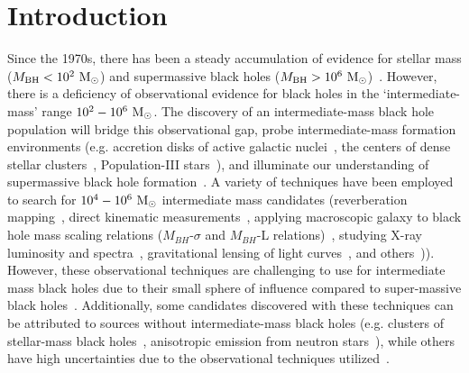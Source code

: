 \documentclass[%
 nofootinbib,
 amsmath,amssymb,
 aps,
 twocolumn,
 superscriptaddress
]{revtex4-2}
\newcommand{\mathcmd}[1]{{\sc \relax\ifmmode#1\else $#1$\fi}\xspace}
\newcommand{\msun}{\mathcmd{\text{M}_\odot}}
\begin{document}
\section{Introduction}
Since the 1970s, there has been a steady accumulation of evidence for stellar mass ($M_\text{BH} < 10^{2} \ \msun$) and supermassive black holes ($M_\text{BH} > 10^{6} \ \msun$)~\cite{Webster:1972:Natur, Balick:1974:ApJ, Ghez:1998:ApJ, Genzel:2010:RvMP, Abbott:2019:PhRvX, EventHorizonTelescopeCollaboration:2019:ApJL, Abbott:2020:arXiv}.  However, there is a deficiency of observational evidence for black holes in the `intermediate-mass' range $10^{2} - 10^{6}\ \msun$. The discovery of an intermediate-mass black hole population will bridge this observational gap, probe intermediate-mass formation environments (e.g. accretion disks of active galactic nuclei~\cite{Tagawa:2021:ApJ, Li:2021:arXiv, Samsing:2020:arXiv, Tagawa:2020:ApJ, Ishibashi:2020:A&A, Grobner:2020:A&A, Yang:2019:PhRvL, McKernan:2019:ApJL, Yang:2019:ApJ, McKernan:2018:ApJ, Bellovary:2016:ApJL, McKernan:2014:MNRAS, McKernan:2012:MNRAS}, the centers of dense stellar clusters~\cite{Banerjee:2021:MNRASa, Zevin:2021:ApJ,Mapelli:2021:arXiv,Weatherford:2021:ApJL, Bouffanais:2021:arXiv, Ballone:2021:MNRAS, Kumamoto:2021:arXiv, Banerjee:2021:MNRASb, Martinez:2020:ApJ, Romero-Shaw:2020:ApJL, Anagnostou:2020:PASA}, Population-III stars~\cite{Toubiana:2021:PhRvL, Farrell:2021:MNRAS, Safarzadeh:2020:ApJL, Liu:2020:MNRAS, Inayoshi:2017:MNRAS}), and illuminate our understanding of supermassive black hole formation~\cite{Askar:2021:MNRAS, ArcaSedda:2019:arXiv, Amaro-Seoane:2007:CQGra, Gurkan:2006:ApJL}. A variety of techniques have been employed to search for $10^{4} - 10^{6}\ \msun$ intermediate mass candidates (reverberation mapping~\cite{Peterson:2014:SSRv}, direct kinematic measurements~\cite{Schodel:2002:Natur, Kiziltan:2017:Natur}, applying macroscopic galaxy to black hole mass scaling relations ($M_{BH}$-$\sigma$ and $M_{BH}$-L relations)~\cite{Graham:2013:ApJ, Wevers:2017:MNRAS}, studying  X-ray luminosity and spectra~\cite{Greene:2004:ApJ, Lin:2020:ApJL}, gravitational lensing of light curves~\cite{paynter_evidence_2021}, and others~\cite{Greene:2020:ARA&A, Koliopanos:2017:mbhe, Mezcua:2017:IJMPD})). However, these observational techniques are challenging to use for intermediate mass black holes due to their small sphere of influence compared to super-massive black holes~\cite{Mezcua:2017:IJMPD}. Additionally, some candidates discovered with these techniques can be attributed to sources without intermediate-mass black holes (e.g. clusters of stellar-mass black holes~\cite{Ridolfi:2016:MNRAS, Freire:2017:MNRAS}, anisotropic emission from neutron stars~\cite{Israel:2017:MNRAS, RodriguezCastillo:2020:ApJ}), while others have high uncertainties due to the observational techniques utilized~\cite{Greene:2020:ARA&A}.
\end{document}
